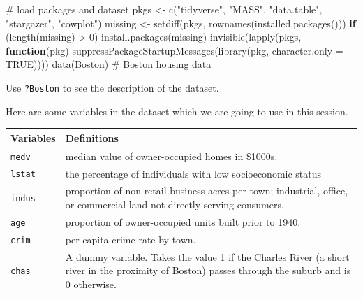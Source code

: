 \documentclass[
  12pt,
  letterpaper,
]{scrbook}
\newenvironment{Shaded}{\begin{snugshade}}{\end{snugshade}}
\newcommand{\AttributeTok}[1]{\textcolor[rgb]{0.40,0.45,0.13}{#1}}
\newcommand{\CommentTok}[1]{\textcolor[rgb]{0.37,0.37,0.37}{#1}}
\newcommand{\ConstantTok}[1]{\textcolor[rgb]{0.56,0.35,0.01}{#1}}
\newcommand{\ControlFlowTok}[1]{\textcolor[rgb]{0.00,0.23,0.31}{\textbf{#1}}}
\newcommand{\DecValTok}[1]{\textcolor[rgb]{0.68,0.00,0.00}{#1}}
\newcommand{\FunctionTok}[1]{\textcolor[rgb]{0.28,0.35,0.67}{#1}}
\newcommand{\NormalTok}[1]{\textcolor[rgb]{0.00,0.23,0.31}{#1}}
\newcommand{\OtherTok}[1]{\textcolor[rgb]{0.00,0.23,0.31}{#1}}
\newcommand{\SpecialCharTok}[1]{\textcolor[rgb]{0.37,0.37,0.37}{#1}}
\newcommand{\StringTok}[1]{\textcolor[rgb]{0.13,0.47,0.30}{#1}}
\theoremstyle{plain}
\theoremstyle{definition}
\theoremstyle{remark}
\begin{document}
\begin{Shaded}
\begin{Highlighting}[]
\CommentTok{\# load packages and dataset}
\NormalTok{pkgs }\OtherTok{\textless{}{-}} \FunctionTok{c}\NormalTok{(}\StringTok{"tidyverse"}\NormalTok{, }\StringTok{"MASS"}\NormalTok{, }\StringTok{"data.table"}\NormalTok{, }\StringTok{"stargazer"}\NormalTok{, }\StringTok{"cowplot"}\NormalTok{)}
\NormalTok{missing }\OtherTok{\textless{}{-}} \FunctionTok{setdiff}\NormalTok{(pkgs, }\FunctionTok{rownames}\NormalTok{(}\FunctionTok{installed.packages}\NormalTok{()))}
\ControlFlowTok{if}\NormalTok{ (}\FunctionTok{length}\NormalTok{(missing) }\SpecialCharTok{\textgreater{}} \DecValTok{0}\NormalTok{) }\FunctionTok{install.packages}\NormalTok{(missing)}
\FunctionTok{invisible}\NormalTok{(}\FunctionTok{lapply}\NormalTok{(pkgs, }\ControlFlowTok{function}\NormalTok{(pkg) }\FunctionTok{suppressPackageStartupMessages}\NormalTok{(}\FunctionTok{library}\NormalTok{(pkg, }\AttributeTok{character.only =} \ConstantTok{TRUE}\NormalTok{))))}
\FunctionTok{data}\NormalTok{(Boston) }\CommentTok{\# Boston housing data}
\end{Highlighting}
\end{Shaded}

Use \texttt{?Boston} to see the description of the dataset.

Here are some variables in the dataset which we are going to use in this
session.

\begin{longtable}[]{@{}
  >{\raggedright\arraybackslash}p{}
  >{\raggedright\arraybackslash}p{}@{}}
\toprule\noalign{}
\begin{minipage}[b]{\linewidth}\raggedright
Variables
\end{minipage} & \begin{minipage}[b]{\linewidth}\raggedright
Definitions
\end{minipage} \\
\midrule\noalign{}
\endhead
\bottomrule\noalign{}
\endlastfoot
\texttt{medv} & median value of owner-occupied homes in {\$1000s}. \\
\texttt{lstat} & the percentage of individuals with low socioeconomic
status \\
\texttt{indus} & proportion of non-retail business acres per town;
industrial, office, or commercial land not directly serving
consumers. \\
\texttt{age} & proportion of owner-occupied units built prior to
1940. \\
\texttt{crim} & per capita crime rate by town. \\
\texttt{chas} & A dummy variable. Takes the value 1 if the Charles River
(a short river in the proximity of Boston) passes through the suburb and
is 0 otherwise. \\
\end{longtable}
\end{document}
